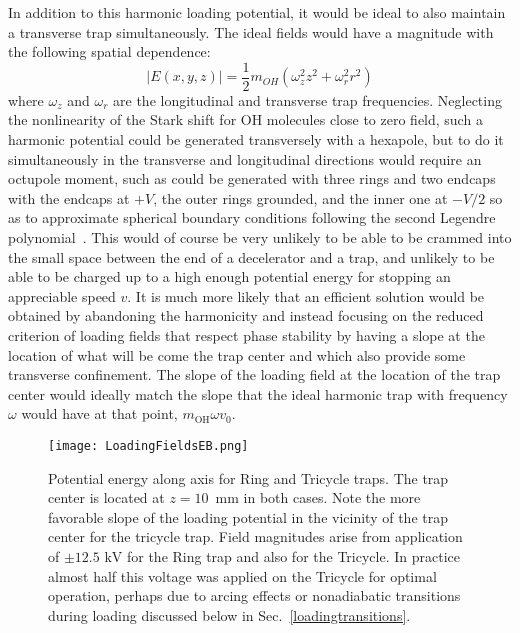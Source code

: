 In addition to this harmonic loading potential, it would be ideal to also maintain a transverse trap simultaneously. 
The ideal fields would have a magnitude with the following spatial dependence:
\begin{equation}
|E(x,y,z)| = \frac{1}{2}m_{OH}\left(\omega_z^2z^2 + \omega_r^2r^2\right)
\end{equation}
where $\omega_z$ and $\omega_r$ are the longitudinal and transverse trap frequencies.
Neglecting the nonlinearity of the Stark shift for OH molecules close to zero field, such a harmonic potential could be generated transversely with a hexapole, but to do it simultaneously in the transverse and longitudinal directions would require an octupole moment, such as could be generated with three rings and two endcaps with the endcaps at $+V$, the outer rings grounded, and the inner one at $-V/2$ so as to approximate spherical boundary conditions following the second Legendre polynomial~\cite{jackson1999classical}.
This would of course be very unlikely to be able to be crammed into the small space between the end of a decelerator and a trap, and unlikely to be able to be charged up to a high enough potential energy for stopping an appreciable speed $v$.
It is much more likely that an efficient solution would be obtained by abandoning the harmonicity and instead focusing on the reduced criterion of loading fields that respect phase stability by having a slope at the location of what will be come the trap center and which also provide some transverse confinement.
The slope of the loading field at the location of the trap center would ideally match the slope that the ideal harmonic trap with frequency $\omega$ would have at that point, $m_\text{OH}\omega v_0$.

\begin{figure}[t!]
\centering
\texttt{[image: LoadingFieldsEB.png]}
\caption[On-Axis Loading for Ring and Tricycle]{\label{loadingringtrike}
Potential energy along axis for Ring and Tricycle traps. The trap center is located at $z=10$~mm in both cases. Note the more favorable slope of the loading potential in the vicinity of the trap center for the tricycle trap. Field magnitudes arise from application of $\pm12.5\text{ kV}$ for the Ring trap and also for the Tricycle. In practice almost half this voltage was applied on the Tricycle for optimal operation, perhaps due to arcing effects or nonadiabatic transitions during loading discussed below in Sec.~\ref{loadingtransitions}.
}
\end{figure}

